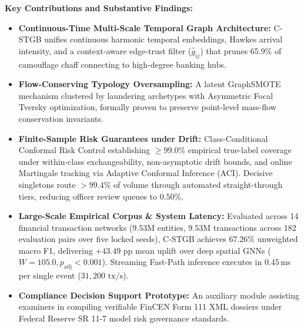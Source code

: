 \documentclass[11pt,a4paper]{article}
\begin{document}
\vspace{0.6em}
\noindent
\textbf{Key Contributions and Substantive Findings:}
\begin{itemize}[leftmargin=*,itemsep=2pt,topsep=2pt]
    \item \textbf{Continuous-Time Multi-Scale Temporal Graph Architecture:} C-STGB unifies continuous harmonic temporal embeddings, Hawkes arrival intensity, and a context-aware edge-trust filter ($\hat{g}_{ij}$) that prunes 65.9\% of camouflage chaff connecting to high-degree banking hubs.
    \item \textbf{Flow-Conserving Typology Oversampling:} A latent GraphSMOTE mechanism clustered by laundering archetypes with Asymmetric Focal Tversky optimization, formally proven to preserve point-level mass-flow conservation invariants.
    \item \textbf{Finite-Sample Risk Guarantees under Drift:} Class-Conditional Conformal Risk Control establishing $\ge 99.0\%$ empirical true-label coverage under within-class exchangeability, non-asymptotic drift bounds, and online Martingale tracking via Adaptive Conformal Inference (ACI). Decisive singletons route $>99.4\%$ of volume through automated straight-through tiers, reducing officer review queues to $0.50\%$.
    \item \textbf{Large-Scale Empirical Corpus \& System Latency:} Evaluated across 14 financial transaction networks ($9.53\text{M}$ entities, $9.53\text{M}$ transactions across 182 evaluation pairs over five locked seeds), C-STGB achieves $67.26\%$ unweighted macro F1, delivering $+43.49\text{ pp}$ mean uplift over deep spatial GNNs ($W=105.0, p_{\text{adj}} < 0.001$). Streaming Fast-Path inference executes in $0.45$\,ms per single event ($31,200\text{ tx/s}$).
    \item \textbf{Compliance Decision Support Prototype:} An auxiliary module assisting examiners in compiling verifiable FinCEN Form 111 XML dossiers under Federal Reserve SR 11-7 model risk governance standards.
\end{itemize}
\end{document}
